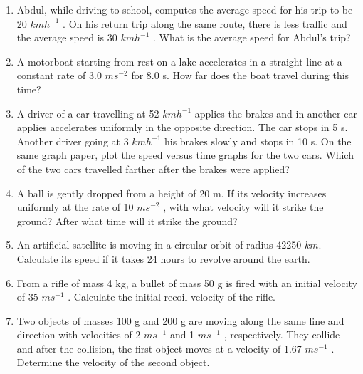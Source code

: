 \begin{enumerate}[label=\arabic*.,ref=\thesection.\theenumi]
\item  Abdul, while driving to school, computes the average speed for his trip to be 20 $km h^{-1}$
. On his return trip along the same
route, there is less traffic and the average speed is 30 $km h^{-1}$
. What is the average speed for Abdul’s trip?
\item  A motorboat starting from rest on a lake accelerates in a straight line at a constant rate of 3.0 $m s^{-2}$
for 8.0 s. How far does the boat travel during this time? 
\item  A driver of a car travelling at 52 $km h^{-1}$
applies the brakes and in another car applies
accelerates uniformly in the opposite direction. The car stops in 5 s. Another driver going at 3 $km h^{-1}$
his brakes slowly and stops in 10 s. On the same graph paper, plot the speed versus time graphs for the two cars. Which of the two cars travelled farther after the brakes were applied?

\item A ball is gently dropped from a height of 20 m. If its velocity increases uniformly at the rate of 10 $m s^{-2}$
, with what velocity
will it strike the ground? After what time will it strike the ground?

\item An artificial satellite is moving in a circular orbit of radius 42250 $km$. Calculate its speed if it takes 24 hours to revolve around the earth.
\item From a rifle of mass 4 kg, a bullet of mass 50 g is fired with an initial velocity of 35 $m s^{-1}$
.
Calculate the initial recoil velocity of the rifle.
\item Two objects of masses 100 g and 200 g are moving along the same line and direction with velocities of 2 $m s^{-1}$ and 1 $m s^{-1}$ , respectively. 
They collide and after the collision, the first object moves at a velocity of 1.67 $m s^{-1}$ 
. Determine the velocity of the second object.


\end{enumerate}
